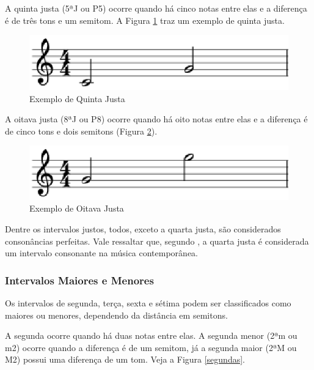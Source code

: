         A quinta justa (5ªJ ou P5) ocorre quando há cinco notas entre elas e a diferença é de três tons e um semitom. A Figura \ref{quintajusta} traz um exemplo de quinta justa.

        \begin{figure}[htb]
          \centering
          \includegraphics[scale=0.6]{figuras/quintajusta.eps}
          \caption{Exemplo de Quinta Justa}
          \label{quintajusta}
        \end{figure}

        A oitava justa (8ªJ ou P8) ocorre quando há oito notas entre elas e a diferença é de cinco tons e dois semitons (Figura \ref{oitavajusta}).

        \begin{figure}[htb]
          \centering
          \includegraphics[scale=0.6]{figuras/oitavajusta.eps}
          \caption{Exemplo de Oitava Justa}
          \label{oitavajusta}
        \end{figure}

        Dentre os intervalos justos, todos, exceto a quarta justa, são considerados consonâncias perfeitas. Vale ressaltar que, segundo , a quarta justa é considerada um intervalo consonante na música contemporânea.

      \subsubsection[Intervalos Maiores e Menores]{Intervalos Maiores e Menores}

        Os intervalos de segunda, terça, sexta e sétima podem ser classificados como maiores ou menores, dependendo da distância em semitons.

        A segunda ocorre quando há duas notas entre elas. A segunda menor (2ªm ou m2) ocorre quando a diferença é de um semitom, já a segunda maior (2ªM ou M2) possui uma diferença de um tom. Veja a Figura \ref{segundas}.

